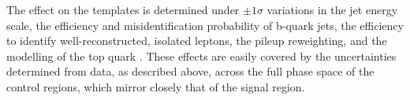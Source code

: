 The effect on the \HTmiss templates is determined under $\pm1\sigma$
variations in the jet energy scale, the efficiency and
misidentification probability of b-quark jets, the efficiency to
identify well-reconstructed, isolated leptons, the pileup reweighting,
and the modelling of the top quark \Pt. These effects
are easily covered by the uncertainties determined from data, as
described above, across the full phase space of the control regions,
which mirror closely that of the signal region.






